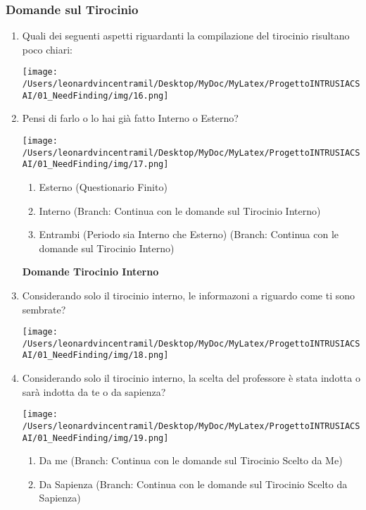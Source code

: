 \subsubsection{Domande sul Tirocinio}
\begin{enumerate}
    \item Quali dei seguenti aspetti riguardanti la compilazione del tirocinio risultano poco chiari:
    \begin{center}
        \texttt{[image: /Users/leonardvincentramil/Desktop/MyDoc/MyLatex/ProgettoINTRUSIACSAI/01\_NeedFinding/img/16.png]}
    \end{center}
    \item Pensi di farlo o lo hai già fatto Interno o Esterno?
    \begin{center}
        \texttt{[image: /Users/leonardvincentramil/Desktop/MyDoc/MyLatex/ProgettoINTRUSIACSAI/01\_NeedFinding/img/17.png]}
    \end{center} 
    \begin{enumerate}
        \item Esterno (Questionario Finito)
        \item Interno (Branch: Continua con le domande sul Tirocinio Interno)
        \item Entrambi (Periodo sia Interno che Esterno) (Branch: Continua con le domande sul Tirocinio Interno)
    \end{enumerate}
    \textbf{Domande Tirocinio Interno}
    \item Considerando solo il tirocinio interno, le informazoni a riguardo come ti sono sembrate?
    \begin{center}
        \texttt{[image: /Users/leonardvincentramil/Desktop/MyDoc/MyLatex/ProgettoINTRUSIACSAI/01\_NeedFinding/img/18.png]}
    \end{center} 
    \item Considerando solo il tirocinio interno, la scelta del professore è stata indotta o sarà indotta da te o da sapienza?
    \begin{center}
        \texttt{[image: /Users/leonardvincentramil/Desktop/MyDoc/MyLatex/ProgettoINTRUSIACSAI/01\_NeedFinding/img/19.png]}
    \end{center} 
    \begin{enumerate}
        \item Da me (Branch: Continua con le domande sul Tirocinio Scelto da Me)
        \item Da Sapienza (Branch: Continua con le domande sul Tirocinio Scelto da Sapienza)
    \end{enumerate}
\end{enumerate}

